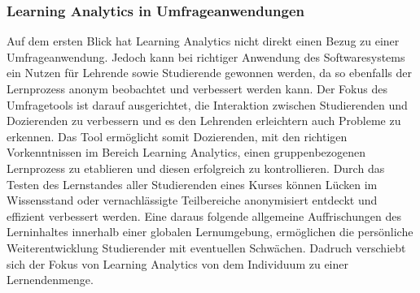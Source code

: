 

\subsubsection{Learning Analytics in Umfrageanwendungen}

Auf dem ersten Blick hat Learning Analytics nicht direkt einen Bezug zu einer Umfrageanwendung.
Jedoch kann bei richtiger Anwendung des Softwaresystems ein Nutzen für Lehrende sowie Studierende gewonnen werden, da so ebenfalls der Lernprozess anonym beobachtet und verbessert werden kann.
Der Fokus des Umfragetools ist darauf ausgerichtet, die Interaktion zwischen Studierenden und Dozierenden zu verbessern und es den Lehrenden erleichtern auch Probleme zu erkennen.
Das Tool ermöglicht somit Dozierenden, mit den richtigen Vorkenntnissen im Bereich Learning Analytics, einen gruppenbezogenen Lernprozess zu etablieren und diesen erfolgreich zu kontrollieren.
Durch das Testen des Lernstandes aller Studierenden eines Kurses können Lücken im Wissensstand oder vernachlässigte Teilbereiche anonymisiert entdeckt und effizient verbessert werden.
Eine daraus folgende allgemeine Auffrischungen des Lerninhaltes innerhalb einer globalen Lernumgebung, ermöglichen die persönliche Weiterentwicklung Studierender mit eventuellen Schwächen.
Dadruch verschiebt sich der Fokus von Learning Analytics von dem Individuum zu einer Lernendenmenge.
